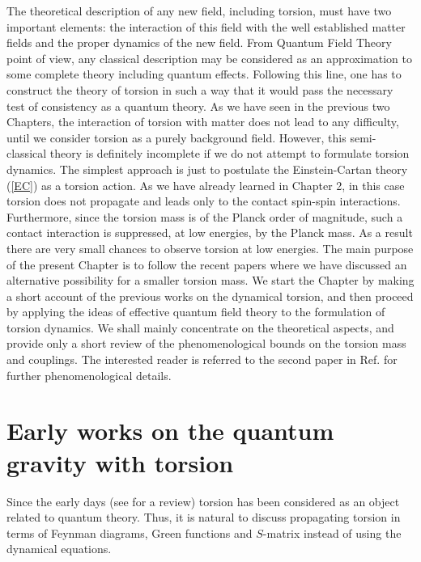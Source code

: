 The theoretical description of any new field, including torsion, must 
have two important elements: the interaction of this field with the well 
established matter fields and the proper dynamics of the new field. 
From Quantum Field Theory point of view, any classical description may
be considered as an approximation to some complete theory including quantum 
effects. Following this line, one has to construct the theory of torsion 
in such a way that it would pass the necessary test of consistency as a 
quantum theory. As we have seen in the previous two Chapters, the 
interaction of torsion with matter does not lead to any difficulty, 
until we consider torsion as a purely background field. However, this 
semi-classical theory is definitely incomplete if we do not attempt to 
formulate torsion dynamics. The simplest approach is just to postulate the 
Einstein-Cartan theory (\ref{EC}) as a torsion action. As we have already 
learned in Chapter 2, in this case torsion does not propagate and leads 
only to the contact spin-spin interactions. Furthermore, since the torsion 
mass is of the Planck order of magnitude, such a contact interaction 
is suppressed, at low energies, by the Planck mass. As a result there 
are very small chances to observe torsion at low energies. The main 
purpose of the present Chapter is to follow the recent papers 
\cite{betor,guhesh} where we have discussed an alternative possibility 
for a smaller torsion mass. We start the Chapter by making a short 
account of the previous works on the dynamical torsion, and 
then proceed by applying the ideas of effective quantum field theory 
to the formulation of torsion dynamics. We shall mainly 
concentrate on the theoretical aspects, and provide only a short 
review of the phenomenological bounds on the torsion mass and 
couplings. The interested reader is referred to the second paper
in Ref. \cite{betor} for further phenomenological details. 

\section{Early works on the quantum gravity with torsion}

Since the early days (see \cite{hehl} for a review) torsion
has been considered as an object related to quantum theory. Thus, it is
natural to discuss propagating torsion in terms of Feynman diagrams, 
Green functions and $S$-matrix instead of using the dynamical equations.

